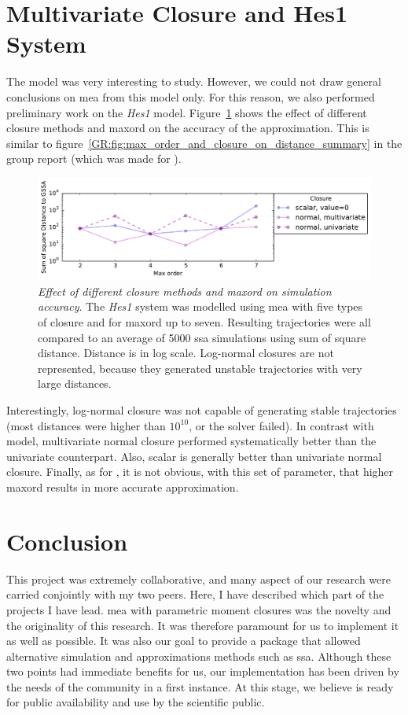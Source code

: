 \section{Multivariate Closure and Hes1 System}
The \pft{} model was very interesting to study. However, we could not draw general conclusions on \gls{mea} from this model only.
For this reason, we also performed preliminary work on the \emph{Hes1} model\cite{ale_general_2013}.
Figure~\ref{fig:hes1} shows the effect of different closure methods and \gls{maxord} on the accuracy of the approximation.
This is similar to figure~\ref*{GR:fig:max_order_and_closure_on_distance_summary} in the group report (which was made for \pft).
\begin{figure}[tbh]
\includegraphics[width=0.95\textwidth{}]{FigureHes1Summary-pdf-7.pdf}
\caption{\emph{Effect of different closure methods and \gls{maxord} on simulation accuracy}.
The \emph{Hes1} system was modelled using \gls{mea} with five types of closure and for \gls{maxord} up to seven.
Resulting trajectories were all compared to an average of 5000 \gls{ssa} simulations using sum of square distance.
Distance is in log scale.
Log-normal closures are not represented, because they generated  unstable trajectories with very large distances.
}
\label{fig:hes1}
\end{figure}

Interestingly, log-normal closure was not capable of generating stable trajectories (most distances were higher than $10^{10}$, or the solver failed).  
In contrast with \pft{} model, multivariate normal closure performed systematically better than the univariate counterpart.
Also, scalar is generally better than univariate normal closure.
Finally, as for \pft, it is not obvious, with this set of parameter, that higher \gls{maxord} results in more accurate approximation.


\section{Conclusion}
This project was extremely collaborative, and many aspect of our research were carried conjointly with my two peers.
Here, I have described which part of the projects I have lead.
\gls{mea} with parametric moment closures was the novelty and the originality of this research.
It was therefore paramount for us to implement it as well as possible.
It was also our goal to provide a package that allowed alternative simulation and approximations methods such as \gls{ssa}.
Although these two points had immediate benefits for us, our implementation has been driven by the needs of the community in a first instance.
At this stage, we believe \means{} is ready for public availability and use by the scientific public. 